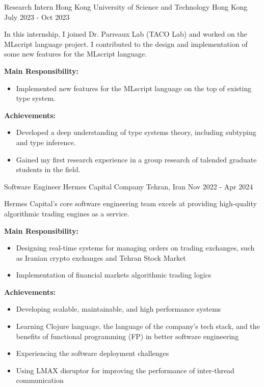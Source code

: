 \begin{cventries}
  \cventry
  {Research Intern}
  {Hong Kong University of Science and Technology}
  {Hong Kong}
  {July 2023 - Oct 2023}
  {
    \begin{cvitems}
    \item {In this internship, I joined Dr. Parreaux Lab (TACO Lab) and worked
        on the MLscript language project.  I contributed to the design and
        implementation of some new features for the MLscript language.}
    \item {\textbf{Main Responsibility:}
        \begin{itemize}[label=-]
        \item Implemented new features for the MLscript language on the top of
          existing type system.
        \end{itemize}
      }
    \item {\textbf{Achievements:}
        \begin{itemize}[label=-]
        \item Developed a deep understanding of type systems theory, including subtyping and type inference.
        \item Gained my first research experience in a group research of talended
          graduate students in the field.
        \end{itemize}
      }
    \end{cvitems}
  }

  \cventry
  {Software Engineer}
  {Hermes Capital Company}
  {Tehran, Iran}
  {Nov 2022 - Apr 2024}
  {
    \begin{cvitems}
      \item {Hermes Capital's core software engineering team excels at providing high-quality algorithmic trading engines as a service.}
      \item {\textbf{Main Responsibility:}
            \begin{itemize}[label=-]
                \item Designing real-time systems for managing orders on trading exchanges, such as Iranian crypto exchanges and Tehran Stock Market
                \item Implementation of financial markets algorithmic trading logics
            \end{itemize}
            }
      \item {\textbf{Achievements:}
            \begin{itemize}[label=-]
                \item Developing scalable, maintainable, and high performance systems
                \item Learning Clojure language, the language of the company’s tech stack, and the benefits of functional programming (FP) in better software engineering
                \item Experiencing the software deployment challenges
                \item Using LMAX disruptor for improving the performance of inter-thread communication
            \end{itemize}
            }
    \end{cvitems}
  }


\end{cventries}
